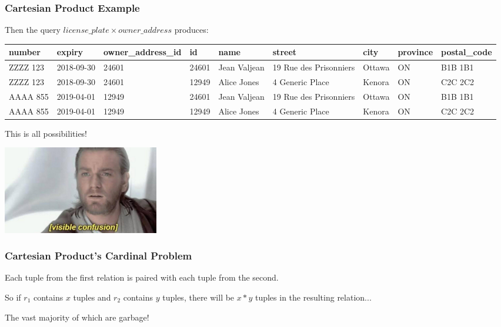 \begin{frame}
\frametitle{Cartesian Product Example}

Then the query $license\_plate \times owner\_address$ produces:

{\tiny
\begin{center}
	\begin{tabular}{|l|l|l|l|l|l|l|l|l|}\hline
		\textbf{number} & \textbf{expiry} & \textbf{owner\_address\_id} & \textbf{id} & \textbf{name} &\textbf{street} & \textbf{city} & \textbf{province} & \textbf{postal\_code} \\ \hline
		ZZZZ 123 & 2018-09-30 & 24601 & 24601 & Jean Valjean & 19 Rue des Prisonniers & Ottawa & ON & B1B 1B1\\ \hline
ZZZZ 123 & 2018-09-30 & 24601 & 12949 & Alice Jones & 4 Generic Place & Kenora & ON & C2C 2C2\\ \hline
		AAAA 855 & 2019-04-01 & 12949 & 24601 & Jean Valjean & 19 Rue des Prisonniers & Ottawa & ON & B1B 1B1\\ \hline
		AAAA 855 & 2019-04-01 & 12949 & 12949 & Alice Jones & 4 Generic Place & Kenora & ON & C2C 2C2\\ \hline
	\end{tabular}
\end{center}
}

This is all possibilities!

\begin{center}
	\includegraphics[width=0.3\textwidth]{images/visibleconfusion.jpg}
\end{center}

\end{frame}



\begin{frame}
\frametitle{Cartesian Product's Cardinal Problem}

Each tuple from the first relation is paired with each tuple from the second. 

So if $r_{1}$ contains $x$ tuples and $r_{2}$ contains $y$ tuples, there will be $x*y$ tuples in the resulting relation... 

The vast majority of which are garbage! 

\end{frame}



